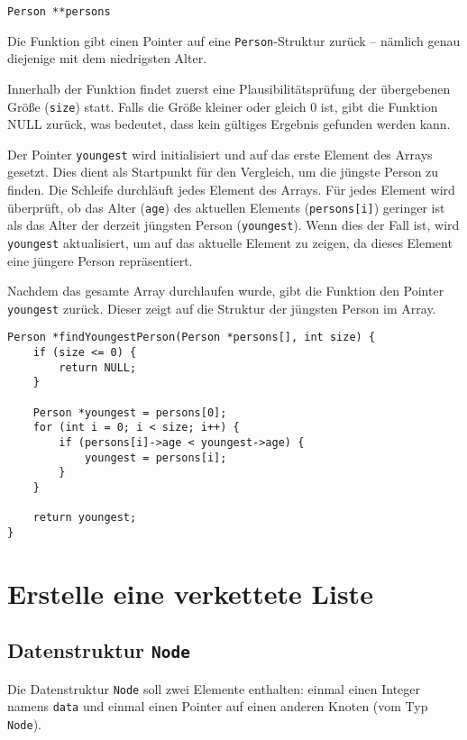 \texttt{Person **persons}

Die Funktion gibt einen Pointer auf eine \texttt{Person}-Struktur zurück
-- nämlich genau diejenige mit dem niedrigsten Alter.

Innerhalb der Funktion findet zuerst eine Plausibilitätsprüfung der übergebenen
Größe (\texttt{size}) statt. Falls die Größe kleiner oder gleich 0 ist,
gibt die Funktion NULL zurück, was bedeutet, dass kein gültiges Ergebnis
gefunden werden kann.

Der Pointer \texttt{youngest} wird initialisiert und auf das erste
Element des Arrays gesetzt. Dies dient als Startpunkt für den Vergleich, um die
jüngste Person zu finden. Die Schleife durchläuft jedes Element des Arrays. Für
jedes Element wird überprüft, ob das Alter (\texttt{age}) des aktuellen
Elements (\texttt{persons[i]}) geringer ist als das Alter der derzeit
jüngsten Person (\texttt{youngest}). Wenn dies der Fall ist, wird
\texttt{youngest} aktualisiert, um auf das aktuelle Element zu zeigen, da
dieses Element eine jüngere Person repräsentiert.

Nachdem das gesamte Array durchlaufen wurde, gibt die Funktion den Pointer
\texttt{youngest} zurück. Dieser zeigt auf die Struktur der jüngsten
Person im Array.

\begin{verbatim}
Person *findYoungestPerson(Person *persons[], int size) {
    if (size <= 0) {
        return NULL;
    }

    Person *youngest = persons[0];
    for (int i = 0; i < size; i++) {
        if (persons[i]->age < youngest->age) {
            youngest = persons[i];
        }
    }

    return youngest;
}
\end{verbatim}





\chapter{Erstelle eine verkettete Liste}

\section*{Datenstruktur \texttt{Node}}

Die Datenstruktur \texttt{Node} soll zwei Elemente enthalten: einmal
einen Integer namens \texttt{data} und einmal einen Pointer auf einen
anderen Knoten (vom Typ \texttt{Node}).

